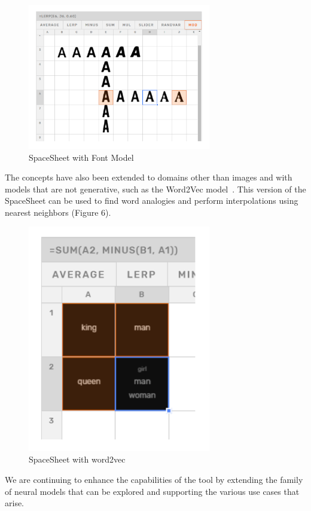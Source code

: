 \documentclass[letterpaper]{article}
\begin{document}
\begin{figure}[ht]
  \centering
  \includegraphics[width=8cm]{figs/02A-use-cases.png}
  \caption{SpaceSheet with Font Model}
\end{figure}

The concepts have also been extended to domains other than images and with models that are not generative, such as the Word2Vec model~\cite{word2vec}. This version of the SpaceSheet can be used to find word analogies and perform interpolations using nearest neighbors (Figure 6).

\begin{figure}[ht]
  \centering
  \includegraphics[width=8cm]{figs/02B-use-cases.png}
  \caption{SpaceSheet with word2vec}
\end{figure}

We are continuing to enhance the capabilities of the tool by extending the family of neural models that can be explored and supporting the various use cases that arise.
\end{document}
